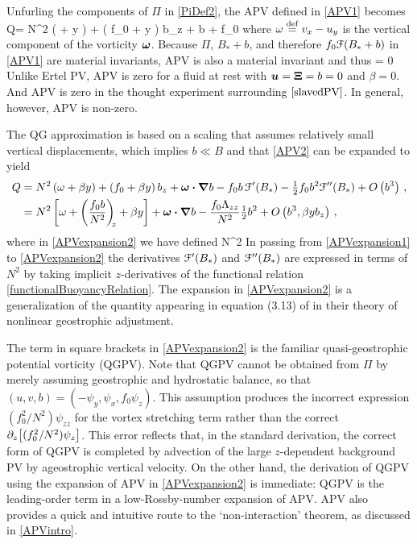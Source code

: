 \documentclass[12pt, oneside]{book}
\begin{document}
Unfurling the components of $\Pi$ in \eqref{PiDef2}, the APV defined in \eqref{APV1} becomes
\beq
Q= N^2 \left ( \omega + \beta y \right ) + \left ( f_0 + \beta y \right ) b_z + \bomega \bcdot \bnabla b + f_0 \big [ \cF(B_*) - \cF(B_*+b) \big ]\com
\label{APV2}
\eeq
where $\omega \stackrel{\mathrm{def}}{=} v_x-u_y$ is the vertical component of the vorticity $\boldsymbol \omega$. 
Because $\Pi$, $B_*+b$, and therefore $f_0 \mathcal{F}(B_* + b)$ in \eqref{APV1}  are material invariants, APV is also a material invariant and thus
\beq
{} = 0 \per \label{APVeqn}
\eeq
Unlike Ertel PV, APV is zero for a fluid at rest with $\boldsymbol u= \boldsymbol {\Xi}=b=0$ and $\beta=0$.  And APV is zero in the thought experiment surrounding $\eqref{slavedPV}$.   In general, however, APV is non-zero.  

\nocite{HollidayMcIntyre}

The QG approximation is based on a scaling that assumes relatively small vertical displacements, which implies $b\ll B$ and that \eqref{APV2} can be expanded to yield
\begin{align}
Q &=  N^2 \left ( \omega + \beta y \right ) + \left ( f_0 + \beta y \right ) b_z + \boldsymbol \omega \boldsymbol \cdot \boldsymbol \nabla b  - f_0 b \, \mathcal{F}'(B_*) - \tfrac{1}{2} f_0 b^2 \mathcal{F}''(B_*) + O\left(b^3\right) \, , \label{APVexpansion1} \\
&= N^2\left[ \omega + \left(\frac{f_0b}{N^2}\right)_{\! \! z}+ \beta y\right]  + \boldsymbol \omega \boldsymbol \cdot \boldsymbol \nabla b - \frac{f_0\Lambda_{zz}}{ N^2} \tfrac{1}{2} b^2 + O\left(b^3,\beta y b_z\right) \, ,
\label{APVexpansion2}
\end{align}
where in \eqref{APVexpansion2} we have defined
\beq
\Lambda {} \ln N^2\per
\eeq
In passing from \eqref{APVexpansion1} to \eqref{APVexpansion2} the derivatives $\mathcal{F}'(B_*)$ and $\mathcal{F}''(B_*)$ are expressed in terms of $N^2$  by taking implicit $z$-derivatives of the functional relation \eqref{functionalBuoyancyRelation}.  The expansion in \eqref{APVexpansion2} is a generalization of the quantity appearing in equation (3.13) of \cite{zeitlin2003} in their theory of nonlinear geostrophic adjustment.

The term in square brackets in \eqref{APVexpansion2} is the familiar quasi-geostrophic potential vorticity (QGPV).  Note that QGPV cannot be obtained from $\Pi$ by merely assuming geostrophic and hydrostatic balance, so that $(u,v,b) = \left ( - \psi_y , \psi_x, f_0 \psi_z \right )$.  This assumption produces the incorrect expression $(f_0^2/N^2) \psi_{zz}$ for the vortex stretching term rather than the correct $\partial_z \big [ (f_0^2/N^2) \psi_z \big ]$.  This error reflects that, in the standard derivation, the correct form of QGPV is completed by advection of the large $z$-dependent background PV by ageostrophic vertical velocity.  On the other hand, the derivation of QGPV using the expansion of APV in \eqref{APVexpansion2} is immediate: QGPV is the leading-order term in a low-Rossby-number expansion of APV.  APV also provides a quick and intuitive route to the `non-interaction' theorem, as discussed in \ch \ref{APVintro}.
\end{document}
